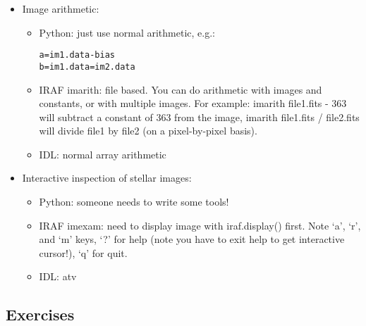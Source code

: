 \documentclass[12pt]{article}
\begin{document}
\begin{itemize}
\item Image arithmetic:
    \begin{itemize}
        \item Python: just use normal arithmetic, e.g.:
            \begin{verbatim}
a=im1.data-bias
b=im1.data=im2.data
            \end{verbatim}
        \item IRAF imarith: file based. You can do arithmetic with images and
            constants, or with multiple images. For example: imarith
            file1.fits - 363 will subtract a constant of 363 from the image,
            imarith file1.fits / file2.fits will divide file1 by file2 (on a
            pixel-by-pixel basis).
        \item IDL: normal array arithmetic
    \end{itemize}

\item Interactive inspection of stellar images:
    \begin{itemize}
        \item Python: someone needs to write some tools!
        \item IRAF imexam: need to display image with iraf.display() first. Note
            `a', `r', and `m' keys, `?' for help (note you have to exit help
            to get interactive cursor!), `q' for quit.
        \item IDL: atv
    \end{itemize}
\end{itemize}

\subsection*{Exercises}
\end{document}
